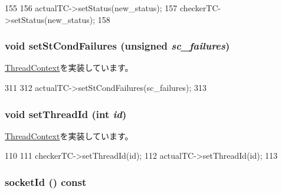 \begin{DoxyCode}
155     {
156         actualTC->setStatus(new_status);
157         checkerTC->setStatus(new_status);
158     }
\end{DoxyCode}
\hypertarget{classCheckerThreadContext_abbe779fa43c72cd485ddb736ab17ff61}{
\subsubsection[{setStCondFailures}]{\setlength{\rightskip}{0pt plus 5cm}void setStCondFailures (unsigned {\em sc\_\-failures})}}
\label{classCheckerThreadContext_abbe779fa43c72cd485ddb736ab17ff61}


\hyperlink{classThreadContext_aaa3506321089a0ec9c36d9ceff17c346}{ThreadContext}を実装しています。


\begin{DoxyCode}
311     {
312         actualTC->setStCondFailures(sc_failures);
313     }
\end{DoxyCode}
\hypertarget{classCheckerThreadContext_a9186b553811fbde99263b3fd831f1b0c}{
\subsubsection[{setThreadId}]{\setlength{\rightskip}{0pt plus 5cm}void setThreadId (int {\em id})}}
\label{classCheckerThreadContext_a9186b553811fbde99263b3fd831f1b0c}


\hyperlink{classThreadContext_a8ab94437bf0aaa86face2bc4b2dfa138}{ThreadContext}を実装しています。


\begin{DoxyCode}
110     {
111         checkerTC->setThreadId(id);
112         actualTC->setThreadId(id);
113     }
\end{DoxyCode}
\hypertarget{classCheckerThreadContext_a1ff97b43199001357718671a4d922d12}{
\subsubsection[{socketId}]{ socketId () const}}
\label{classCheckerThreadContext_a1ff97b43199001357718671a4d922d12}



